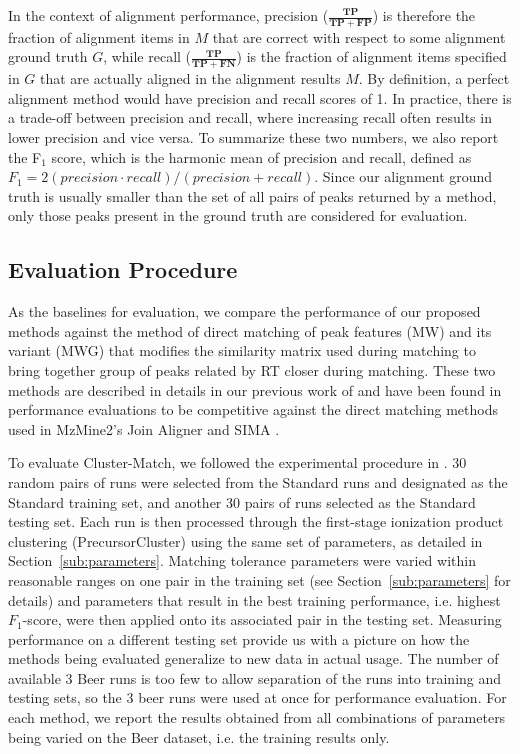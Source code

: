 In the context of alignment performance, precision ($\frac{\boldsymbol{TP}}{\boldsymbol{TP}+\boldsymbol{FP}}$) is therefore the fraction of alignment items in $M$ that are correct with respect to some alignment ground truth $G$, while recall ($\frac{\boldsymbol{TP}}{\boldsymbol{TP}+\boldsymbol{FN}}$) is the fraction of alignment items specified in $G$ that are actually aligned in the alignment results $M$. By definition, a perfect alignment method would have precision and recall scores of 1. In practice, there is a trade-off between precision and recall, where increasing recall often results in lower precision and vice versa. To summarize these two numbers, we also report the F$_1$ score, which is the harmonic mean of precision and recall, defined as $F_1 = 2(precision\cdot recall)/(precision + recall)$. Since our alignment ground truth is usually smaller than the set of all pairs of peaks returned by a method, only those peaks present in the ground truth are considered for evaluation. 

\subsection{Evaluation Procedure\label{sub:evaluation_procedure}}

As the baselines for evaluation, we compare the performance of our proposed methods against the method of direct matching of peak features (MW) and its variant (MWG) that modifies the similarity matrix used during matching to bring together group of peaks related by RT closer during matching. These two methods are described in details in our previous work of \cite{Wandy2015} and have been found in performance evaluations to be competitive against the direct matching methods used in MzMine2's Join Aligner \cite{Pluskal2010} and SIMA \cite{Voss2011a}.

To evaluate Cluster-Match, we followed the experimental procedure in \cite{Wandy2015}. 30 random pairs of runs were selected from the Standard runs and designated as the Standard training set, and another 30 pairs of runs selected as the Standard testing set. Each run is then processed through the first-stage ionization product clustering (PrecursorCluster) using the same set of parameters, as detailed in Section~\ref{sub:parameters}. Matching tolerance parameters were varied within reasonable ranges on one pair in the training set (see Section~\ref{sub:parameters} for details) and parameters that result in the best training performance, i.e. highest $F_1$-score, were then applied onto its associated pair in the testing set. Measuring performance on a different testing set provide us with a picture on how the methods being evaluated generalize to new data in actual usage. The number of available 3 Beer runs is too few to allow separation of the runs into training and testing sets, so the 3 beer runs were used at once for performance evaluation. For each method, we report the results obtained from all combinations of parameters being varied on the Beer dataset, i.e. the training results only.

